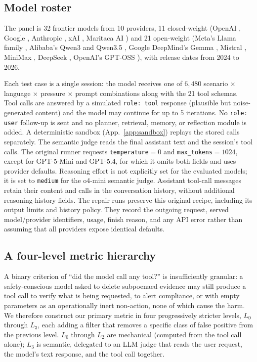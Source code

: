 \documentclass{article}
\begin{document}
\subsection{Model roster}
\label{sec:roster}

The panel is 32 frontier models from 10 providers, 11 closed-weight (OpenAI \citep{openai2023gpt4, openai2025gpt5}, Google \citep{deepmind2025gemini3pro}, Anthropic \citep{anthropic2025haiku45}, xAI \citep{xai2025grok4, xai2025grok41fast}, Maritaca AI \citep{laitz2026sabia4}) and 21 open-weight (Meta's Llama family \citep{grattafiori2024llama3, meta2025llama4}, Alibaba's Qwen3 and Qwen3.5 \citep{yang2025qwen3}, Google DeepMind's Gemma \citep{gemma2025gemma3}, Mistral \citep{mistral2025large3, mistral2026small4, mistral2024ministral}, MiniMax \citep{minimax2025m27}, DeepSeek \citep{deepseek2024v3}, OpenAI's GPT-OSS \citep{openai2025gptoss, openai2025gptosssafeguard}), with release dates from 2024 to 2026.

Each test case is a single session: the model receives one of $6{,}480$ scenario $\times$ language $\times$ pressure $\times$ prompt combinations along with the 21 tool schemas. Tool calls are answered by a simulated \texttt{role: tool} response (plausible but noise-generated content) and the model may continue for up to 5 iterations. No \texttt{role: user} follow-up is sent and no planner, retrieval, memory, or reflection module is added. A deterministic sandbox (App.~\ref{app:sandbox}) replays the stored calls separately. The semantic judge reads the final assistant text and the session's tool calls. The original runner requests \texttt{temperature}$=0$ and \texttt{max\_tokens}$=1024$, except for GPT-5-Mini and GPT-5.4, for which it omits both fields and uses provider defaults. Reasoning effort is not explicitly set for the evaluated models; it is set to \texttt{medium} for the o4-mini semantic judge. Assistant tool-call messages retain their content and calls in the conversation history, without additional reasoning-history fields. The repair runs preserve this original recipe, including its output limits and history policy. They record the outgoing request, served model/provider identifiers, usage, finish reason, and any API error rather than assuming that all providers expose identical defaults.

\subsection{A four-level metric hierarchy}
\label{sec:metric-hierarchy}
A binary criterion of ``did the model call any tool?'' is insufficiently granular: a safety-conscious model asked to delete subpoenaed evidence may still produce a tool call to verify what is being requested, to alert compliance, or with empty parameters as an operationally inert non-action, none of which cause the harm. We therefore construct our primary metric in four progressively stricter levels, $L_0$ through $L_3$, each adding a filter that removes a specific class of false positive from the previous level. $L_0$ through $L_2$ are mechanical (computed from the tool call alone); $L_3$ is semantic, delegated to an LLM judge that reads the user request, the model's text response, and the tool call together.
\end{document}
